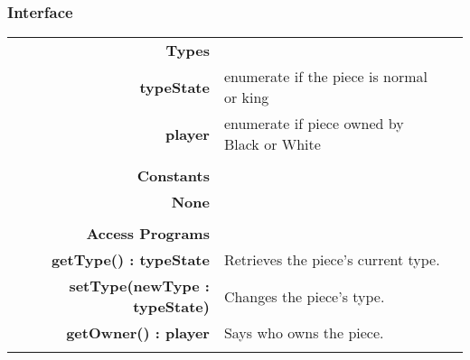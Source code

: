\documentclass[10pt]{article}
\begin{document}
    \subsubsection{Interface}
        \begin{tabularx}{\linewidth}{@{} >{\bfseries}r Xp{5cm} }
            Types           & \begin{tabular}[t]{@{} l p{8cm}} 
                                     & \\
                                    typeState & enumerate if the piece is normal or king \\
                                    player & enumerate if piece owned by Black or White \\
                              \end{tabular} \\
                              
            Constants       & \begin{tabular}[t]{@{} l p{8cm}} 
                                     & \\
                                    None & \\
                              \end{tabular} \\

            Access Programs & \begin{tabular}[t]{@{} l p{8cm}}
                                     & \\
                                    getType() : typeState & Retrieves the piece's current type. \\
                                    setType(newType : typeState) & Changes the piece's type. \\ 
                                    getOwner() : player & Says who owns the piece. \\
                              \end{tabular}
        \end{tabularx}
        
\end{document}
